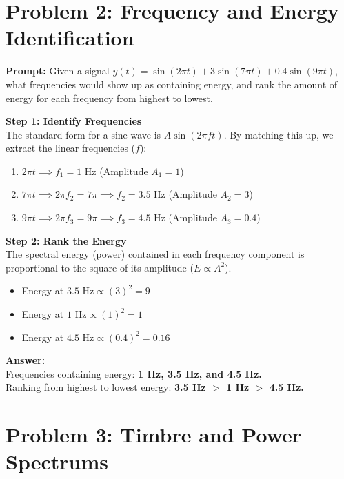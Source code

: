 \documentclass[11pt]{article}
\begin{document}
\section*{Problem 2: Frequency and Energy Identification}

\textbf{Prompt:} Given a signal $y(t) = \sin(2\pi t) + 3\sin(7\pi t) + 0.4\sin(9\pi t)$, what frequencies would show up as containing energy, and rank the amount of energy for each frequency from highest to lowest.

\textbf{Step 1: Identify Frequencies} \\
The standard form for a sine wave is $A\sin(2\pi f t)$. By matching this up, we extract the linear frequencies ($f$):
\begin{enumerate}
\item $2\pi t \implies f_1 = 1 \text{ Hz}$ (Amplitude $A_1 = 1$)
\item $7\pi t \implies 2\pi f_2 = 7\pi \implies f_2 = 3.5 \text{ Hz}$ (Amplitude $A_2 = 3$)
\item $9\pi t \implies 2\pi f_3 = 9\pi \implies f_3 = 4.5 \text{ Hz}$ (Amplitude $A_3 = 0.4$)
\end{enumerate}

\textbf{Step 2: Rank the Energy} \\
The spectral energy (power) contained in each frequency component is proportional to the square of its amplitude ($E \propto A^2$).
\begin{itemize}
\item Energy at $3.5\text{ Hz} \propto (3)^2 = 9$
\item Energy at $1\text{ Hz} \propto (1)^2 = 1$
\item Energy at $4.5\text{ Hz} \propto (0.4)^2 = 0.16$
\end{itemize}

\textbf{Answer:} \\
Frequencies containing energy: \textbf{1 Hz, 3.5 Hz, and 4.5 Hz.} \\
Ranking from highest to lowest energy: \textbf{3.5 Hz $>$ 1 Hz $>$ 4.5 Hz.}

\section*{Problem 3: Timbre and Power Spectrums}
\end{document}
